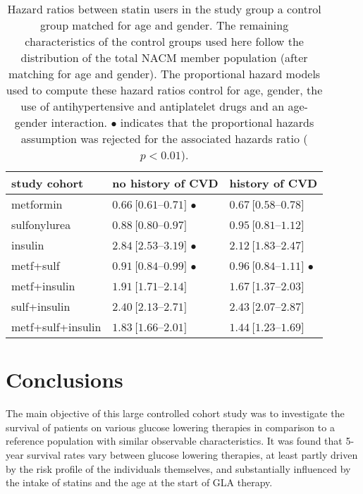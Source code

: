 \begin{table}[!h]	%
\centering
\begin{tabular}{lll}
\toprule
study cohort	& no history of CVD		& history of CVD \\%
\midrule

metformin 				& $0.66\ [0.61$--$0.71]$ $\bullet$ & $0.67\ [0.58$--$0.78]$ \\ %
sulfonylurea 			& $0.88\ [0.80$--$0.97]$ & $0.95\ [0.81$--$1.12]$ \\ %
insulin					& $2.84\ [2.53$--$3.19]$ $\bullet$ & $2.12\ [1.83$--$2.47]$ \\ %

metf+sulf				& $0.91\ [0.84$--$0.99]$ $\bullet$ &  $0.96\ [0.84$--$1.11]$ $\bullet$ \\ %
metf+insulin			& $1.91\ [1.71$--$2.14]$ & $1.67\ [1.37$--$2.03]$ \\ %
sulf+insulin			& $2.40\ [2.13$--$2.71]$ & $2.43\ [2.07$--$2.87]$ \\ %
metf+sulf+insulin		& $1.83\ [1.66$--$2.01]$ & $1.44\ [1.23$--$1.69]$ \\ %
\bottomrule
\end{tabular}
\caption{Hazard ratios between statin users in the study group a control group matched for age and gender. 
The remaining characteristics of the control groups used here follow the distribution of the total NACM member population (after matching for age and gender).
The proportional hazard models used to compute these hazard ratios control for age, gender, the use of antihypertensive and antiplatelet drugs and an age-gender interaction. $\bullet$ indicates that the proportional hazards assumption was rejected for the associated hazards ratio ($p<0.01$).} \label{table:survival-statins-hrs}
\end{table}

\section{Conclusions}
The main objective of this large controlled cohort study was to investigate the survival of patients on various glucose lowering therapies in comparison to a reference population with similar observable characteristics. It was found that 5-year survival rates vary between glucose lowering therapies, at least partly driven by the risk profile of the individuals themselves, and substantially influenced by the intake of statins and the age at the start of GLA therapy.

